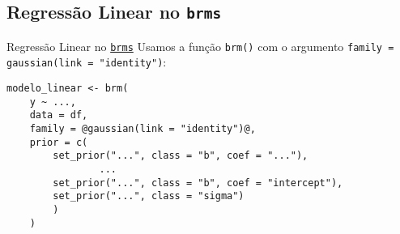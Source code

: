 \subsection{Regressão Linear no \texttt{brms}}
\begin{frame}[fragile]{Regressão Linear no \href{https://paul-buerkner.github.io/brms/}{\texttt{brms}}}
    Usamos a função \texttt{brm()} com o argumento \texttt{family = gaussian(link = "identity")}:
    \vfill
    \begin{lstlisting}[basicstyle=\small]
    modelo_linear <- brm(
    y ~ ...,
    data = df,
    family = @gaussian(link = "identity")@,
    prior = c(
        set_prior("...", class = "b", coef = "..."),
                ...
        set_prior("...", class = "b", coef = "intercept"),
        set_prior("...", class = "sigma")
        )
    )
    \end{lstlisting}
\end{frame}
